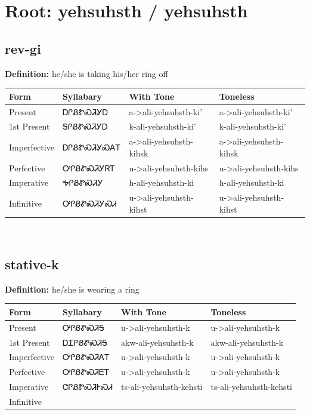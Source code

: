\documentclass{article}%
\begin{document}
%
\normalsize%
\section*{Root: yehsuhsth / yehsuhsth}%
\subsection*{rev-gi}%
\textbf{Definition: }%
he/she is taking his/her ring off%
\\[0.5em]%
\begin{tabular}{|l|l|l|l|}%
\hline%
\textbf{Form}&\textbf{Syllabary}&\textbf{With Tone}&\textbf{Toneless}\\%
\hline%
Present&ᎠᎵᏰᏑᏍᏘᎩᎠ&a{-}>ali{-}yehsuhsth{-}ki'&a{-}>ali{-}yehsuhsth{-}ki'\\%
1st Present&ᎦᎵᏰᏑᏍᏘᎩᎠ&k{-}ali{-}yehsuhsth{-}ki'&k{-}ali{-}yehsuhsth{-}ki'\\%
Imperfective&ᎠᎵᏰᏑᏍᏘᎩᏍᎪᎢ&a{-}>ali{-}yehsuhsth{-}kihsk&a{-}>ali{-}yehsuhsth{-}kihsk\\%
Perfective&ᎤᎵᏰᏑᏍᏘᎩᏒᎢ&u{-}>ali{-}yehsuhsth{-}kihs&u{-}>ali{-}yehsuhsth{-}kihs\\%
Imperative&ᎭᎵᏰᏑᏍᏘᎩ&h{-}ali{-}yehsuhsth{-}ki&h{-}ali{-}yehsuhsth{-}ki\\%
Infinitive&ᎤᎵᏰᏑᏍᏘᎩᏍᏗ&u{-}>ali{-}yehsuhsth{-}kihst&u{-}>ali{-}yehsuhsth{-}kihst\\%
\hline%
\end{tabular}%
\\[1em]%
\subsection*{stative-k}%
\textbf{Definition: }%
he/she is wearing a ring%
\\[0.5em]%
\begin{tabular}{|l|l|l|l|}%
\hline%
\textbf{Form}&\textbf{Syllabary}&\textbf{With Tone}&\textbf{Toneless}\\%
\hline%
Present&ᎤᎵᏰᏑᏍᏘᎦ&u{-}>ali{-}yehsuhsth{-}k&u{-}>ali{-}yehsuhsth{-}k\\%
1st Present&ᎠᏆᎵᏰᏑᏍᏘᎦ&akw{-}ali{-}yehsuhsth{-}k&akw{-}ali{-}yehsuhsth{-}k\\%
Imperfective&ᎤᎵᏰᏑᏍᏘᎪᎢ&u{-}>ali{-}yehsuhsth{-}k&u{-}>ali{-}yehsuhsth{-}k\\%
Perfective&ᎤᎵᏰᏑᏍᏘᎬᎢ&u{-}>ali{-}yehsuhsth{-}k&u{-}>ali{-}yehsuhsth{-}k\\%
Imperative&ᏣᎵᏰᏑᏍᏘᎨᏍᏗ&ts{-}ali{-}yehsuhsth{-}kehsti&ts{-}ali{-}yehsuhsth{-}kehsti\\%
Infinitive&&&\\%
\hline%
\end{tabular}%
\\[1em]%
\end{document}
